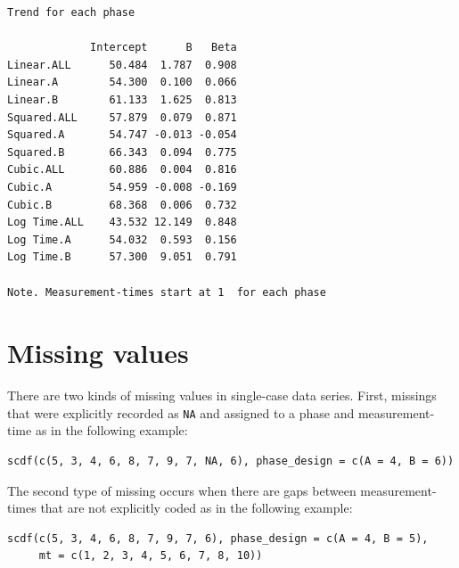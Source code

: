 \documentclass[
  letterpaper,
  DIV=11,
  numbers=noendperiod]{scrreprt}
\newenvironment{Shaded}{\begin{snugshade}}{\end{snugshade}}
\newcommand{\AttributeTok}[1]{\textcolor[rgb]{0.40,0.45,0.13}{#1}}
\newcommand{\CommentTok}[1]{\textcolor[rgb]{0.37,0.37,0.37}{#1}}
\newcommand{\DecValTok}[1]{\textcolor[rgb]{0.68,0.00,0.00}{#1}}
\newcommand{\FunctionTok}[1]{\textcolor[rgb]{0.28,0.35,0.67}{#1}}
\newcommand{\NormalTok}[1]{\textcolor[rgb]{0.00,0.23,0.31}{#1}}
\newcommand{\OtherTok}[1]{\textcolor[rgb]{0.00,0.23,0.31}{#1}}
\newcommand{\SpecialCharTok}[1]{\textcolor[rgb]{0.37,0.37,0.37}{#1}}
\newcommand{\StringTok}[1]{\textcolor[rgb]{0.13,0.47,0.30}{#1}}
\begin{document}
\begin{Shaded}
\end{Shaded}

\begin{verbatim}
Trend for each phase

             Intercept      B   Beta
Linear.ALL      50.484  1.787  0.908
Linear.A        54.300  0.100  0.066
Linear.B        61.133  1.625  0.813
Squared.ALL     57.879  0.079  0.871
Squared.A       54.747 -0.013 -0.054
Squared.B       66.343  0.094  0.775
Cubic.ALL       60.886  0.004  0.816
Cubic.A         54.959 -0.008 -0.169
Cubic.B         68.368  0.006  0.732
Log Time.ALL    43.532 12.149  0.848
Log Time.A      54.032  0.593  0.156
Log Time.B      57.300  9.051  0.791

Note. Measurement-times start at 1  for each phase
\end{verbatim}

\hypertarget{missing-values}{%
\section{Missing values}\label{missing-values}}

There are two kinds of missing values in single-case data series. First,
missings that were explicitly recorded as \texttt{NA} and assigned to a
phase and measurement-time as in the following example:

\begin{verbatim}
scdf(c(5, 3, 4, 6, 8, 7, 9, 7, NA, 6), phase_design = c(A = 4, B = 6))
\end{verbatim}

The second type of missing occurs when there are gaps between
measurement-times that are not explicitly coded as in the following
example:

\begin{verbatim}
scdf(c(5, 3, 4, 6, 8, 7, 9, 7, 6), phase_design = c(A = 4, B = 5), 
     mt = c(1, 2, 3, 4, 5, 6, 7, 8, 10))
\end{verbatim}
\end{document}
